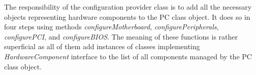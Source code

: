 %
%

The responsibility of the configuration provider class is to add all the
necessary objects representing hardware components to the PC class object. It
does so in four steps using methods \emph{configureMotherboard},
\emph{configurePeripherals}, \emph{configurePCI}, and \emph{configureBIOS}. The
meaning of these functions is rather superficial as all of them add instances
of classes implementing \emph{HardwareComponent} interface to the list of all
components managed by the PC class object.


\begin{codeblock}
    
\end{codeblock}

%
%
%


